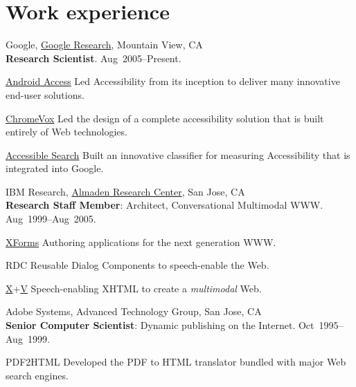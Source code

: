 \documentclass{article}
\begin{document}
\section*{Work experience}
\begin{compactitem}
  \item {Google},
  \href{http://www.google.com/search?q=\%22tv+raman\%22}{Google Research}, Mountain View, CA\\
  \textbf{Research Scientist}.
\hfill Aug~2005--Present.
\begin{compactdesc}
\item[\href{http://eyes-free.googlecode.com}{Android Access}]  Led  Accessibility from its
inception to deliver many innovative end-user solutions.
\item[\href{http://google-axs-chrome.googlecode.com}{ChromeVox}]  Led the design of a  complete accessibility
solution that is built entirely of Web technologies.
\item[\href{http://labs.google.com/accessible}{Accessible Search}] Built an innovative classifier for
  measuring  Accessibility  that is integrated into Google.
  
\end{compactdesc}

\item {IBM Research},
\href{http://www.google.com/search?q=tv+raman+IBM+Almaden}{Almaden Research Center}, San Jose, CA\\
  \textbf{Research Staff Member}: Architect, Conversational
  Multimodal WWW\@. \hfill Aug~1999--Aug~2005.
\begin{compactdesc}
\item [\href{http://www.amazon.com/XForms-XML-Powered-Web-Forms/dp/0321154991}{XForms}] Authoring applications for the next generation
  WWW.
\item [RDC] Reusable Dialog Components to speech-enable the Web.

\item [\href{http://www.w3.org/tr/xml-events}{X$+$V}] Speech-enabling XHTML to create a \emph{multimodal}
  Web.
\end{compactdesc}
\item   {Adobe Systems},  {Advanced Technology Group}, San Jose, CA\\
  \textbf{Senior Computer Scientist}: Dynamic publishing on the
  Internet.  \hfill Oct~1995--Aug~1999.
\begin{compactdesc}
\item[PDF2HTML] Developed the PDF to HTML translator bundled with
  major Web search engines.
  

\end{compactdesc}
\end{compactitem}
\end{document}
